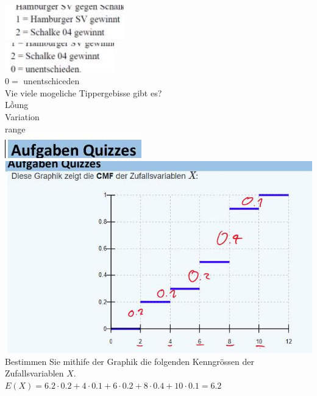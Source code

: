 \documentclass[10pt]{article}
\begin{document}
\begin{itemize}
\includegraphics[width=\linewidth]{images/2024_12_29_0906b02acf849bda8665g-3(22)}\\
\includegraphics[width=\linewidth]{images/2024_12_29_0906b02acf849bda8665g-3(1)}\\
$0=$ unentschiceden\\
Vie viele mogeliche Tippergebisse gibt es?\\
Lồung\\
Variation\\
range\\
\includegraphics[width=\linewidth]{images/2024_12_29_0906b02acf849bda8665g-3(9)}\\
\includegraphics[width=\linewidth]{images/2024_12_29_0906b02acf849bda8665g-3(20)}Bestimmen Sie mithife der Graphik die folgenden Kenngrössen der Zufallsvariablen $X$.\\
$E(X)=6.2 \cdot 0.2+4 \cdot 0.1+6 \cdot 0.2+8 \cdot 0.4+10 \cdot 0.1=6.2$
\end{itemize}
\end{document}
